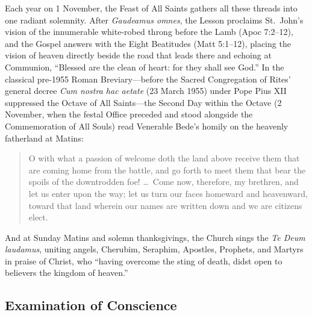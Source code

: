 Each year on 1 November, the Feast of All Saints gathers all these threads into one radiant solemnity. After \textit{Gaudeamus omnes}, the Lesson proclaims St.\ John's vision of the innumerable white-robed throng before the Lamb (Apoc 7:2--12), and the Gospel answers with the Eight Beatitudes (Matt 5:1--12), placing the vision of heaven directly beside the road that leads there and echoing at Communion, ``Blessed are the clean of heart: for they shall see God.'' In the classical pre-1955 Roman Breviary---before the Sacred Congregation of Rites' general decree \textit{Cum nostra hac aetate} (23 March 1955) under Pope Pius XII suppressed the Octave of All Saints---the Second Day within the Octave (2 November, when the festal Office preceded and stood alongside the Commemoration of All Souls) read Venerable Bede's homily on the heavenly fatherland at Matins:

\begin{quote}
O with what a passion of welcome doth the land above receive them that are coming home from the battle, and go forth to meet them that bear the spoils of the downtrodden foe! \dots\ Come now, therefore, my brethren, and let us enter upon the way; let us turn our faces homeward and heavenward, toward that land wherein our names are written down and we are citizens elect.
\end{quote}

And at Sunday Matins and solemn thanksgivings, the Church sings the \textit{Te Deum laudamus}, uniting angels, Cherubim, Seraphim, Apostles, Prophets, and Martyrs in praise of Christ, who ``having overcome the sting of death, didst open to believers the kingdom of heaven.''

\subsection*{Examination of Conscience}

